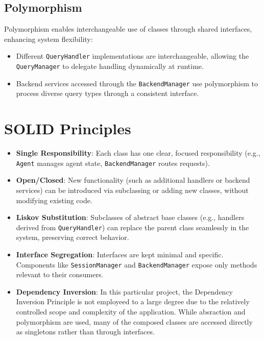 \documentclass[11pt]{article}
\begin{document}
\subsection{Polymorphism}

Polymorphism enables interchangeable use of classes through shared interfaces, enhancing system flexibility:
\begin{itemize}
    \item Different \texttt{QueryHandler} implementations are interchangeable, allowing the \texttt{QueryManager} to delegate handling dynamically at runtime.

    \item Backend services accessed through the \texttt{BackendManager} use polymorphism to process diverse query types through a consistent interface.
\end{itemize}



\section{SOLID Principles}
\begin{itemize}
	\item \textbf{Single Responsibility}: Each class has one clear, focused responsibility (e.g., \texttt{Agent} manages agent state, \texttt{BackendManager} routes requests).

	\item \textbf{Open/Closed}: New functionality (such as additional handlers or backend services) can be introduced via subclassing or adding new classes, without modifying existing code.

	\item \textbf{Liskov Substitution}: Subclasses of abstract base classes (e.g., handlers derived from \texttt{QueryHandler}) can replace the parent class seamlessly in the system, preserving correct behavior.

	\item \textbf{Interface Segregation}: Interfaces are kept minimal and specific. Components like \texttt{SessionManager} and \texttt{BackendManager} expose only methods relevant to their consumers.

	\item \textbf{Dependency Inversion}: In this particular project, the Dependency Inversion Principle is not employeed to a large degree due to the relatively controlled scope and complexity of the application. While absraction and polymorphism are used, many of the composed classes are accessed directly as singletons rather than through interfaces.
\end{itemize}
\end{document}
